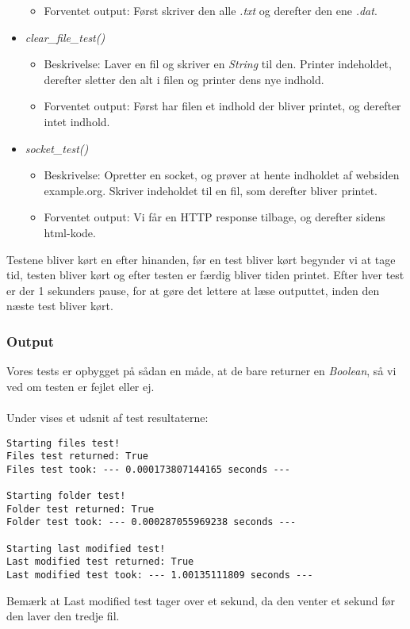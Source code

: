 \documentclass[11pt]{article}
\begin{document}
\begin{itemize}
\begin{itemize}
  \item Forventet output: Først skriver den alle \textit{.txt} og derefter den ene \textit{.dat}.
  \end{itemize}
\item \textit{clear\_file\_test()}
  \begin{itemize}
  \item Beskrivelse: Laver en fil og skriver en \textit{String} til den. Printer indeholdet, derefter sletter den alt i filen og printer dens nye indhold.
  \item Forventet output: Først har filen et indhold der bliver printet, og derefter intet indhold.
  \end{itemize}
\item \textit{socket\_test()}
  \begin{itemize}
  \item Beskrivelse: Opretter en socket, og prøver at hente indholdet af websiden example.org. Skriver indeholdet til en fil, som derefter bliver printet.
  \item Forventet output: Vi får en HTTP response tilbage, og derefter sidens html-kode.
  \end{itemize}
\end{itemize}
Testene bliver kørt en efter hinanden, før en test bliver kørt begynder vi at tage tid, testen bliver kørt og efter testen er færdig bliver tiden printet. Efter hver test er der 1 sekunders pause, for at gøre det lettere at læse outputtet, inden den næste test bliver kørt.
\subsubsection{Output}
Vores tests er opbygget på sådan en måde, at de bare returner en \textit{Boolean}, så vi ved om testen er fejlet eller ej. \\ \\
Under vises et udsnit af test resultaterne:
\begin{lstlisting}
Starting files test!
Files test returned: True
Files test took: --- 0.000173807144165 seconds ---

Starting folder test!
Folder test returned: True
Folder test took: --- 0.000287055969238 seconds ---

Starting last modified test!
Last modified test returned: True
Last modified test took: --- 1.00135111809 seconds ---
\end{lstlisting}
Bemærk at Last modified test tager over et sekund, da den venter et sekund før den laver den tredje fil.
\end{document}

